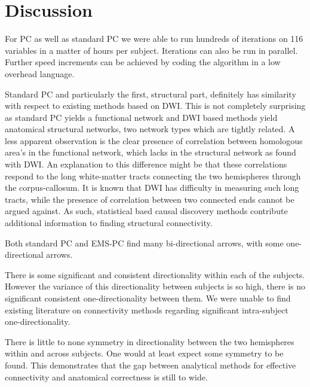 \documentclass[a4paper, 10pt, english, onecolumn]{article}
\begin{document}
\section{Discussion}



For PC as well as standard PC we were able to run hundreds of iterations on 116 variables in a matter of hours per subject.
Iterations can also be run in parallel.
Further speed increments can be achieved by coding the algorithm in a low overhead language.

Standard PC and particularly the first, structural part, definitely has similarity with respect to existing methods based on DWI.
This is not completely surprising as standard PC yields a functional network and DWI based methods yield anatomical structural networks, two network types which are tightly related.
A less apparent observation is the clear presence of correlation between homologous area's in the functional network, which lacks in the structural network as found with DWI.
An explanation to this difference might be that these correlations respond to the long white-matter tracts connecting the two hemispheres through the corpus-callosum.
It is known that DWI has difficulty in measuring such long tracts, while the presence of correlation between two connected ends cannot be argued against.
As such, statistical baed causal discovery methods contribute additional information to finding structural connectivity.

Both standard PC and EMS-PC find many bi-directional arrows, with some one-directional arrows.

There is some significant and consistent directionality within each of the subjects.
However the variance of this directionality between subjects is so high, there is no significant consistent one-directionality between them.
We were unable to find existing literature on connectivity methods regarding significant intra-subject one-directionality.

There is little to none symmetry in directionality between the two hemispheres within and across subjects.
One would at least expect some symmetry to be found.
This demonstrates that the gap between analytical methods for effective connectivity and anatomical correctness is still to wide.
\end{document}
